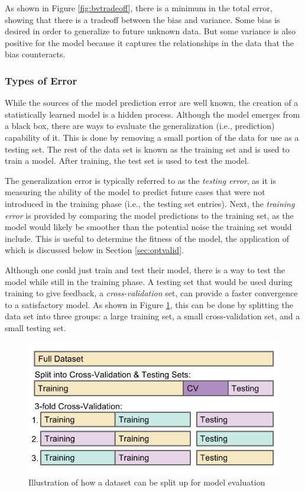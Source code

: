 As shown in Figure \ref{fig:bvtradeoff}, there is a minimum in the total error,
showing that there is a tradeoff between the bias and variance. Some bias is
desired in order to generalize to future unknown data. But some variance is
also positive for the model because it captures the relationships in the data
that the bias counteracts. 

\subsubsection{Types of Error}

While the sources of the model prediction error are well known, the creation of
a statistically learned model is a hidden process. Although the model emerges
from a black box, there are ways to evaluate the generalization (i.e.,
prediction) capability of it.  This is done by removing a small portion of the
data for use as a testing set.  The rest of the data set is known as the
training set and is used to train a model. After training, the test set is used
to test the model.  

The generalization error is typically referred to as the \textit{testing
error}, as it is measuring the ability of the model to predict future cases
that were not introduced in the training phase (i.e., the testing set entries).
Next, the \textit{training error} is provided by comparing the model
predictions to the training set, as the model would likely be smoother than the
potential noise the training set would include. This is useful to determine the
fitness of the model, the application of which is discussed below in Section
\ref{sec:optvalid}.

Although one could just train and test their model, there is a way to test the
model while still in the training phase. A testing set that would be used
during training to give feedback, a \textit{cross-validation} set, can provide
a faster convergence to a satisfactory model. As shown in Figure
\ref{fig:cverror}, this can be done by splitting the data set into three
groups: a large training set, a small cross-validation set, and a small testing
set. 

\begin{figure}[!htb]
  \includegraphics[width=\linewidth]{./chapters/litrev/cverror.png}
  \caption{Illustration of how a dataset can be split up for model evaluation}
  \label{fig:cverror}
\end{figure}

